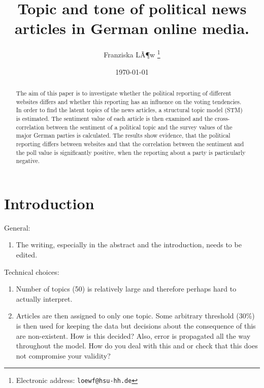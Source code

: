 \documentclass[12pt,a4paper,notitlepage]{article}
\title{Topic and tone of political news articles in German online media.}
\date{\today}
\author{Franziska LÃ¶w%
  \thanks{Electronic address: \texttt{loewf@hsu-hh.de}}}
\affil{Department of Industrial Economics,\\ Helmut Schmidt University,\\ Hamburg, Germany}
\begin{document}
\begin{titlepage}
	\maketitle
	\begin{abstract}
	The aim of this paper is to investigate whether the political reporting of different websites differs and whether this reporting has an influence on the voting tendencies. In order to find the latent topics of the news articles, a structural topic model (STM) is estimated. The sentiment value of each article is then examined and the cross-correlation between the sentiment of a political topic and the survey values of the major German parties is calculated. The results show evidence, that the political reporting differs between websites and that the correlation between the sentiment and the poll value is significantly positive, when the reporting about a party is particularly negative.

	\end{abstract}

\end{titlepage}

\tableofcontents

\pagebreak

\section{Introduction}

General:
\begin{enumerate}
	\item The writing, especially in the abstract and the introduction, needs to be edited.
\end{enumerate}

Technical choices:
\begin{enumerate}
	\item Number of topics (50) is relatively large and therefore perhaps hard to actually interpret. 
	\item Articles are then assigned to only one topic. Some arbitrary threshold (30\%) is then used for keeping the data but decisions about the consequence of this are non-existent. How is this decided? Also, error is propagated all the way throughout the model. How do you deal with this and or check that this does not compromise your validity?
\end{enumerate}
\end{document}
